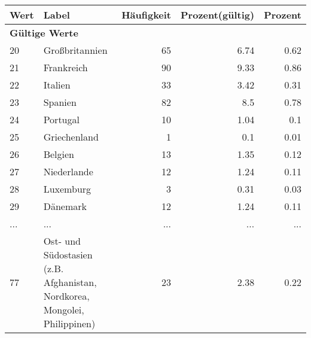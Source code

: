      \begin{longtable}{lXrrr}
     \toprule
     \textbf{Wert} & \textbf{Label} & \textbf{Häufigkeit} & \textbf{Prozent(gültig)} & \textbf{Prozent} \\
     \endhead
     \midrule
     \multicolumn{5}{l}{\textbf{Gültige Werte}}\\
        20 & \multicolumn{1}{X}{Großbritannien} & %
          \num{65} &
          \num[round-mode=places,round-precision=2]{6,74} &
          \num[round-mode=places,round-precision=2]{0,62} \\
        21 & \multicolumn{1}{X}{Frankreich} & %
          \num{90} &
          \num[round-mode=places,round-precision=2]{9,33} &
          \num[round-mode=places,round-precision=2]{0,86} \\
        22 & \multicolumn{1}{X}{Italien} & %
          \num{33} &
          \num[round-mode=places,round-precision=2]{3,42} &
          \num[round-mode=places,round-precision=2]{0,31} \\
        23 & \multicolumn{1}{X}{Spanien} & %
          \num{82} &
          \num[round-mode=places,round-precision=2]{8,5} &
          \num[round-mode=places,round-precision=2]{0,78} \\
        24 & \multicolumn{1}{X}{Portugal} & %
          \num{10} &
          \num[round-mode=places,round-precision=2]{1,04} &
          \num[round-mode=places,round-precision=2]{0,1} \\
        25 & \multicolumn{1}{X}{Griechenland} & %
          \num{1} &
          \num[round-mode=places,round-precision=2]{0,1} &
          \num[round-mode=places,round-precision=2]{0,01} \\
        26 & \multicolumn{1}{X}{Belgien} & %
          \num{13} &
          \num[round-mode=places,round-precision=2]{1,35} &
          \num[round-mode=places,round-precision=2]{0,12} \\
        27 & \multicolumn{1}{X}{Niederlande} & %
          \num{12} &
          \num[round-mode=places,round-precision=2]{1,24} &
          \num[round-mode=places,round-precision=2]{0,11} \\
        28 & \multicolumn{1}{X}{Luxemburg} & %
          \num{3} &
          \num[round-mode=places,round-precision=2]{0,31} &
          \num[round-mode=places,round-precision=2]{0,03} \\
        29 & \multicolumn{1}{X}{Dänemark} & %
          \num{12} &
          \num[round-mode=places,round-precision=2]{1,24} &
          \num[round-mode=places,round-precision=2]{0,11} \\
       ... & ... & ... & ... & ... \\
        77 & \multicolumn{1}{X}{Ost- und Südostasien (z.B. Afghanistan, Nordkorea, Mongolei, Philippinen)} & %
          \num{23} &
          \num[round-mode=places,round-precision=2]{2,38} &
          \num[round-mode=places,round-precision=2]{0,22} \\


\end{longtable}
